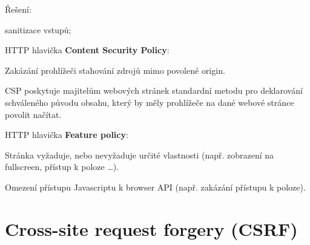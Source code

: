 \begin{compactitem}
    \item Řešení: \begin{compactitem}
        \item sanitizace vstupů;

        \item HTTP hlavička \textbf{Content Security Policy}: \begin{compactitem}
            \item Zakázání prohlížeči stahování zdrojů mimo povolené origin.
            \item CSP poskytuje majitelům webových stránek standardní metodu pro deklarování schváleného původu obsahu, který by měly prohlížeče na dané webové stránce povolit načítat.
        \end{compactitem}

        \item HTTP hlavička \textbf{Feature policy}: \begin{compactitem}
            \item Stránka vyžaduje, nebo nevyžaduje určité vlastnosti (např. zobrazení na fullscreen, přístup k poloze \ldots).
            \item Omezení přístupu Javascriptu k browser API (např. zakázání přístupu k poloze).
        \end{compactitem}
    \end{compactitem}
\end{compactitem}


\section{Cross-site request forgery (CSRF)}

